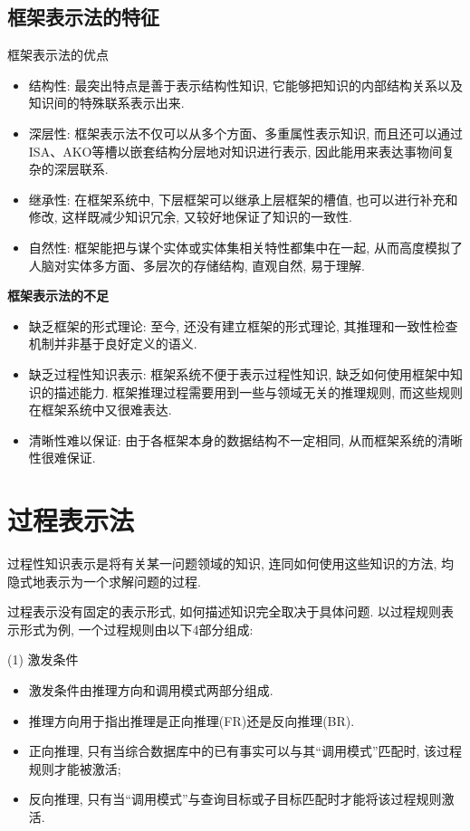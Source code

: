 \subsection{框架表示法的特征}
框架表示法的优点
\begin{itemize}
\item 结构性: 最突出特点是善于表示结构性知识, 它能够把知识的内部结构关系以及知识间的特殊联系表示出来.
\item 深层性:  框架表示法不仅可以从多个方面、多重属性表示知识, 而且还可以通过ISA、AKO等槽以嵌套结构分层地对知识进行表示, 因此能用来表达事物间复杂的深层联系.
\item 继承性: 在框架系统中, 下层框架可以继承上层框架的槽值, 也可以进行补充和修改, 这样既减少知识冗余, 又较好地保证了知识的一致性.
\item 自然性: 框架能把与谋个实体或实体集相关特性都集中在一起, 从而高度模拟了人脑对实体多方面、多层次的存储结构, 直观自然, 易于理解.
\end{itemize}

\indent\textbf{框架表示法的不足}
\begin{itemize}
\item 缺乏框架的形式理论: 至今, 还没有建立框架的形式理论, 其推理和一致性检查机制并非基于良好定义的语义.
\item 缺乏过程性知识表示: 框架系统不便于表示过程性知识, 缺乏如何使用框架中知识的描述能力. 框架推理过程需要用到一些与领域无关的推理规则, 而这些规则在框架系统中又很难表达.
\item 清晰性难以保证: 由于各框架本身的数据结构不一定相同, 从而框架系统的清晰性很难保证.
\end{itemize}
\section{过程表示法}
过程性知识表示是将有关某一问题领域的知识, 连同如何使用这些知识的方法, 均隐式地表示为一个求解问题的过程.
%
%
%

过程表示没有固定的表示形式, 如何描述知识完全取决于具体问题. 以过程规则表示形式为例, 一个过程规则由以下4部分组成:

(1) 激发条件
\begin{itemize}
\item 激发条件由推理方向和调用模式两部分组成.
\item 推理方向用于指出推理是正向推理(FR)还是反向推理(BR).
\item 正向推理, 只有当综合数据库中的已有事实可以与其“调用模式”匹配时, 该过程规则才能被激活;
\item 反向推理, 只有当“调用模式”与查询目标或子目标匹配时才能将该过程规则激活.
\end{itemize}

